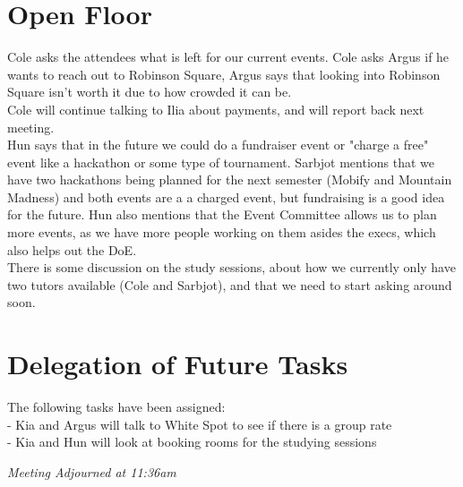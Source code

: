 \documentclass[12pt]{article}
\begin{document}
\section{Open Floor} \label{sec:Open-Floor}
\noindent Cole asks the attendees what is left for our current events. Cole asks Argus if he wants to reach out to Robinson Square, Argus says that looking into Robinson Square isn't worth it due to how crowded it can be. \\ 

\noindent Cole will continue talking to Ilia about payments, and will report back next meeting. \\ 

\noindent Hun says that in the future we could do a fundraiser event or "charge a free" event like a hackathon or some type of tournament. Sarbjot mentions that we have two hackathons being planned for the next semester (Mobify and Mountain Madness) and both events are a a charged event, but fundraising is a good idea for the future. Hun also mentions that the Event Committee allows us to plan more events, as we have more people working on them asides the execs, which also helps out the DoE.  \\

\noindent There is some discussion on the study sessions, about how we currently only have two tutors available (Cole and Sarbjot), and that we need to start asking around soon.  

\section{Delegation of Future Tasks} \label{sec: Future}
\noindent The following tasks have been assigned: \\
- Kia and Argus will talk to White Spot to see if there is a group rate \\
- Kia and Hun will look at booking rooms for the studying sessions 

\begin{center}
\em{Meeting Adjourned at 11:36am}
\end{center}
\end{document}
